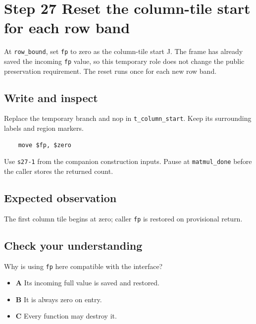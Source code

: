 \section{Step 27 Reset the column-tile start for each row band}\label{matmul-s27}

At \texttt{row\_bound}, set \texttt{fp} to zero as the column-tile start J. The frame has already saved the incoming \texttt{fp} value, so this temporary role does not change the public preservation requirement. The reset runs once for each new row band.

\subsection{Write and inspect}
Replace the temporary branch and nop in \texttt{t\_column\_start}. Keep its surrounding labels and region markers.

\begin{verbatim}
    move $fp, $zero
\end{verbatim}
Use \texttt{s27-1} from the companion construction inputs. Pause at \texttt{matmul\_done} before the caller stores the returned count.

\subsection{Expected observation}
The first column tile begins at zero; caller \texttt{fp} is restored on provisional return.

\subsection{Check your understanding}
Why is using \texttt{fp} here compatible with the interface?

\begin{itemize}
\item \textbf{A} Its incoming full value is saved and restored.
\item \textbf{B} It is always zero on entry.
\item \textbf{C} Every function may destroy it.
\end{itemize}

